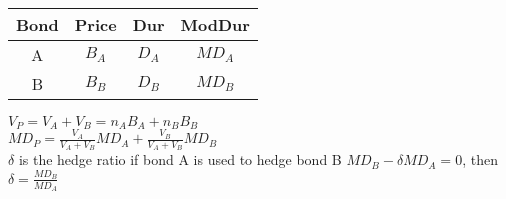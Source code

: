 \begin{center}
	\begin{tabular}{ |c|c|c|c| } 
		\hline
		Bond & Price & Dur & ModDur \\ 
		\hline
		A & $B_A$ & $D_A$ &  $MD_A$ \\ 
		B & $B_B$ & $D_B$ &  $MD_B$ \\ 
		\hline
	\end{tabular}
\end{center}

$V_P=V_A+V_B = n_AB_A + n_B B_B$ \\
$MD_P = \frac{V_A}{V_A+V_B} MD_A + \frac{V_B}{V_A+V_B}MD_B$ \\

$\delta$ is the hedge ratio if bond A is used to hedge bond B  $MD_B-\delta MD_A=0$, then  $\delta = \frac{MD_B}{MD_A}$


